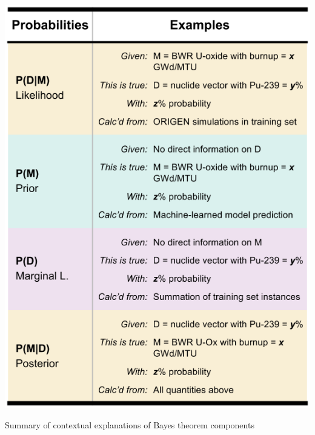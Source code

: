 \begin{table}[!hp]
  \centering
  \includegraphics[width=\linewidth]{./chapters/litrev/bayes.png}
  \caption{Summary of contextual explanations of Bayes theorem components}
  \label{tbl:bayes}
\end{table}

